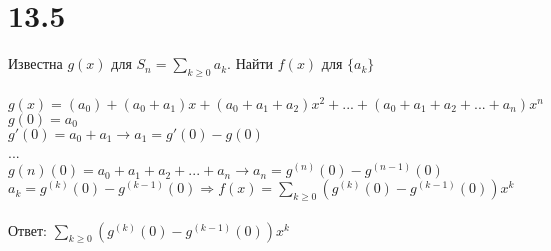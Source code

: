 \documentclass{article}
\begin{document}
\section{13.5}
Известна $g(x)$ для $S_n=\sum\limits_{k\geqslant0}a_k$. Найти $f(x)$ для $\{a_k\}$\\\\
$g(x)=(a_0)+(a_0+a_1)x+(a_0+a_1+a_2)x^2+...+(a_0+a_1+a_2+...+a_n)x^n$\\
$g(0)=a_0$\\
$g'(0)=a_0+a_1 \rightarrow a_1=g'(0)-g(0)$\\
...\\
$g{(n)}(0)=a_0+a_1+a_2+...+a_n \rightarrow a_n=g^{(n)}(0)-g^{(n-1)}(0)$\\
$a_k=g^{(k)}(0)-g^{(k-1)}(0) \Longrightarrow f(x)=\sum\limits_{k\geqslant0}(g^{(k)}(0)-g^{(k-1)}(0))x^k$\\\\
Ответ: $\sum\limits_{k\geqslant0}(g^{(k)}(0)-g^{(k-1)}(0))x^k$
\end{document}
